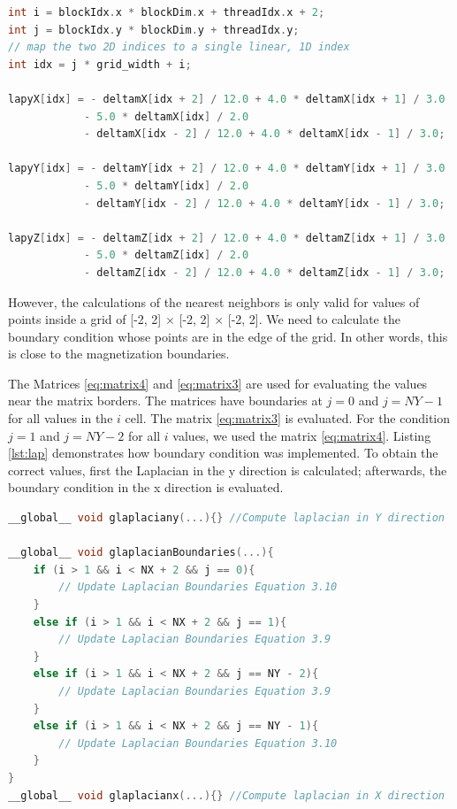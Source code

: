 \begin{lstlisting}[language=C++, label={lst:lpay}, caption={Laplacian evaluation for x, y and z coordinate.}]
int i = blockIdx.x * blockDim.x + threadIdx.x + 2;
int j = blockIdx.y * blockDim.y + threadIdx.y;
// map the two 2D indices to a single linear, 1D index
int idx = j * grid_width + i;

lapyX[idx] = - deltamX[idx + 2] / 12.0 + 4.0 * deltamX[idx + 1] / 3.0
			- 5.0 * deltamX[idx] / 2.0
			- deltamX[idx - 2] / 12.0 + 4.0 * deltamX[idx - 1] / 3.0;	
			
lapyY[idx] = - deltamY[idx + 2] / 12.0 + 4.0 * deltamY[idx + 1] / 3.0
			- 5.0 * deltamY[idx] / 2.0
			- deltamY[idx - 2] / 12.0 + 4.0 * deltamY[idx - 1] / 3.0;	
			
lapyZ[idx] = - deltamZ[idx + 2] / 12.0 + 4.0 * deltamZ[idx + 1] / 3.0
			- 5.0 * deltamZ[idx] / 2.0
			- deltamZ[idx - 2] / 12.0 + 4.0 * deltamZ[idx - 1] / 3.0;	
\end{lstlisting}


However, the calculations of the nearest neighbors is only valid for values of points inside a grid of [-2, 2] $\times$ [-2, 2] $\times$ [-2, 2]. We need to calculate the boundary condition whose points are in the edge of the grid. In other words, this is close to the magnetization boundaries.

 The Matrices \ref{eq:matrix4} and \ref{eq:matrix3} are used for evaluating the values near the matrix borders. The matrices have boundaries at $j = 0$ and $j = NY - 1$ for all values in the $i$ cell. The matrix \ref{eq:matrix3} is evaluated. For the condition $j = 1$ and $j = NY - 2$ for all $i$ values, we used the matrix \ref{eq:matrix4}. Listing \ref{lst:lap} demonstrates how boundary condition was implemented. To obtain the correct values, first the Laplacian in the y direction is calculated; afterwards, the boundary condition in the x direction is evaluated.

\begin{lstlisting}[language=C++, label={lst:lap}, caption={Evaluation of Laplacian X, Y with boundary condition.}]
__global__ void glaplaciany(...){} //Compute laplacian in Y direction

__global__ void glaplacianBoundaries(...){
    if (i > 1 && i < NX + 2 && j == 0){
     	// Update Laplacian Boundaries Equation 3.10
    }
    else if (i > 1 && i < NX + 2 && j == 1){
  		// Update Laplacian Boundaries Equation 3.9
    }
    else if (i > 1 && i < NX + 2 && j == NY - 2){
        // Update Laplacian Boundaries Equation 3.9
    }
    else if (i > 1 && i < NX + 2 && j == NY - 1){
        // Update Laplacian Boundaries Equation 3.10
    }
}
__global__ void glaplacianx(...){} //Compute laplacian in X direction
\end{lstlisting}

